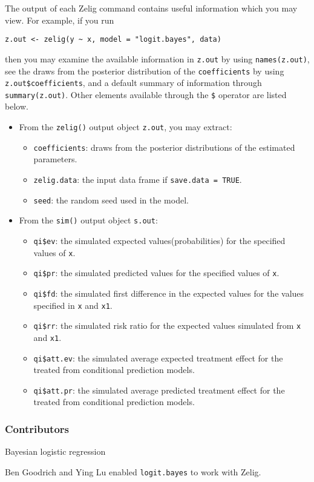 The output of each Zelig command contains useful information which you may
view. For example, if you run
\begin{verbatim}
z.out <- zelig(y ~ x, model = "logit.bayes", data)
\end{verbatim}

\noindent then you may examine the available information in \texttt{z.out} by
using \texttt{names(z.out)}, see the draws from the posterior distribution of
the \texttt{coefficients} by using \texttt{z.out\$coefficients}, and a default
summary of information through \texttt{summary(z.out)}. Other elements
available through the \texttt{\$} operator are listed below.

\begin{itemize}
\item From the \texttt{zelig()} output object \texttt{z.out}, you may extract:

\begin{itemize}
\item \texttt{coefficients}: draws from the posterior distributions
of the estimated parameters.
   \item {\tt zelig.data}: the input data frame if {\tt save.data = TRUE}.  
\item \texttt{seed}: the random seed used in the model.

\end{itemize}

\item From the \texttt{sim()} output object \texttt{s.out}:

\begin{itemize}
\item \texttt{qi\$ev}: the simulated expected values(probabilities) for the specified
values of \texttt{x}.

\item \texttt{qi\$pr}: the simulated predicted values for the specified values
of \texttt{x}.

\item \texttt{qi\$fd}: the simulated first difference in the expected
values for the values specified in \texttt{x} and \texttt{x1}.

\item \texttt{qi\$rr}: the simulated risk ratio for the expected values
simulated from \texttt{x} and \texttt{x1}.

\item \texttt{qi\$att.ev}: the simulated average expected treatment effect
for the treated from conditional prediction models.

\item \texttt{qi\$att.pr}: the simulated average predicted treatment effect
for the treated from conditional prediction models.
\end{itemize}
\end{itemize}

\subsubsection{Contributors}
Bayesian logistic regression 

\noindent Ben Goodrich and Ying Lu enabled \texttt{logit.bayes} to work with Zelig.

